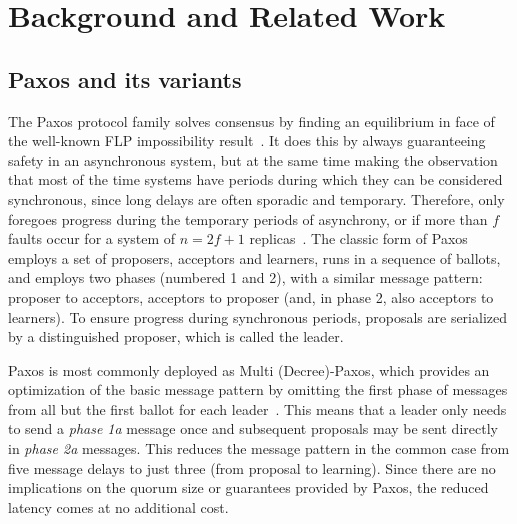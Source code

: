 \section{Background and Related Work}
 
\subsection{Paxos and its variants} \label{Paxos} 

The Paxos protocol family solves consensus by finding an equilibrium in face of the well-known FLP impossibility result~\cite{FLP85}. It does this by always guaranteeing safety in an asynchronous system, but at the same time making the observation that most of the time systems have periods during which they can be considered synchronous, since long delays are often sporadic and temporary. Therefore, only foregoes progress during the temporary periods of asynchrony, or if more than $f$ faults occur for a system of $n=2f+1$ replicas~\cite{L01}. The classic form of Paxos employs a set of proposers, acceptors and learners, runs in a sequence of ballots, and employs two phases (numbered 1 and 2), with a similar message pattern: proposer to acceptors, acceptors to proposer (and, in phase 2, also acceptors to learners). To ensure progress during synchronous periods, proposals are serialized by a distinguished proposer, which is called the leader.\par
Paxos is most commonly deployed as Multi (Decree)-Paxos, which provides an optimization of the basic message pattern by omitting the first phase of messages from all but the first ballot for each leader~\cite{Renesse2011}. This means that a leader only needs to send a \textit{phase 1a} message once and subsequent proposals may be sent directly in \textit{phase 2a} messages. This reduces the message pattern in the common case from five message delays to just three (from proposal to learning). Since there are no implications on the quorum size or guarantees provided by Paxos, the reduced latency comes at no additional cost. \par

